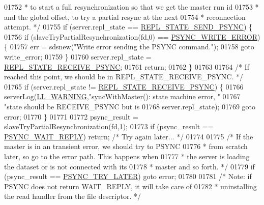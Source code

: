\begin{DoxyCode}
{{{{{{{{{{{{{{{{{{{{{{{{{{{{{{{{{{{{{{{{{{{{{{{{{{{{{{{{{{{{{{{{01752 \textcolor{comment}{     * to start a full resynchronization so that we get the master run id}
01753 \textcolor{comment}{     * and the global offset, to try a partial resync at the next}
01754 \textcolor{comment}{     * reconnection attempt. */}
01755     \textcolor{keywordflow}{if} (server.repl\_state == \hyperlink{server_8h_aa9951dea877e8e4f04d910ecf88f92fd}{REPL\_STATE\_SEND\_PSYNC}) \{
01756         \textcolor{keywordflow}{if} (slaveTryPartialResynchronization(fd,0) == \hyperlink{replication_8c_a63479df7aec0103920c029d735f6b4ba}{PSYNC\_WRITE\_ERROR}) \{
01757             err = sdsnew(\textcolor{stringliteral}{"Write error sending the PSYNC command."});
01758             \textcolor{keywordflow}{goto} write\_error;
01759         \}
01760         server.repl\_state = \hyperlink{server_8h_a31432ee96d5825316f1d96bcbda28d58}{REPL\_STATE\_RECEIVE\_PSYNC};
01761         \textcolor{keywordflow}{return};
01762     \}
01763 
01764     \textcolor{comment}{/* If reached this point, we should be in REPL\_STATE\_RECEIVE\_PSYNC. */}
01765     \textcolor{keywordflow}{if} (server.repl\_state != \hyperlink{server_8h_a31432ee96d5825316f1d96bcbda28d58}{REPL\_STATE\_RECEIVE\_PSYNC}) \{
01766         serverLog(\hyperlink{server_8h_a31229b9334bba7d6be2a72970967a14b}{LL\_WARNING},\textcolor{stringliteral}{"syncWithMaster(): state machine error, "}
01767                              \textcolor{stringliteral}{"state should be RECEIVE\_PSYNC but is %
01768                              server.repl\_state);
01769         \textcolor{keywordflow}{goto} error;
01770     \}
01771 
01772     psync\_result = slaveTryPartialResynchronization(fd,1);
01773     \textcolor{keywordflow}{if} (psync\_result == \hyperlink{replication_8c_a4308c1e1292e0c34cf84d6e54b4869aa}{PSYNC\_WAIT\_REPLY}) \textcolor{keywordflow}{return}; \textcolor{comment}{/* Try again later... */}
01774 
01775     \textcolor{comment}{/* If the master is in an transient error, we should try to PSYNC}
01776 \textcolor{comment}{     * from scratch later, so go to the error path. This happens when}
01777 \textcolor{comment}{     * the server is loading the dataset or is not connected with its}
01778 \textcolor{comment}{     * master and so forth. */}
01779     \textcolor{keywordflow}{if} (psync\_result == \hyperlink{replication_8c_a033726631820c6ebdfb2f034a870e9da}{PSYNC\_TRY\_LATER}) \textcolor{keywordflow}{goto} error;
01780 
01781     \textcolor{comment}{/* Note: if PSYNC does not return WAIT\_REPLY, it will take care of}
01782 \textcolor{comment}{     * uninstalling the read handler from the file descriptor. */}
}}}}}}}}}}}}}}}}}}}}}}}}}}}}}}}}}}}}}}}}}}}}}}}}}}}}}}}}}}}}}}}}}
\end{DoxyCode}
